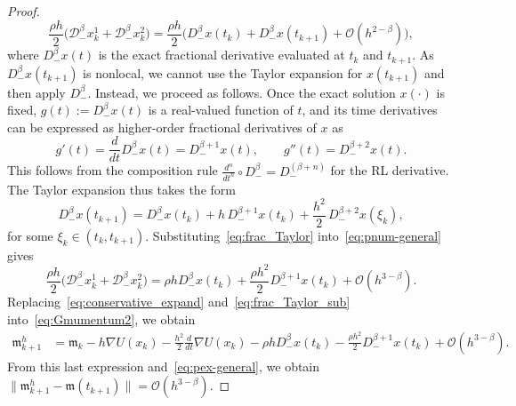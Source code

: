 \documentclass[a4paper,10pt,reqno]{amsart}
\theoremstyle{definition}
\newcommand{\m}{\mathfrak{m}}
\begin{document}
\begin{proof}
  \begin{equation}
\frac{\rho h}{2}\Big(\mathcal D_{-}^{\beta}  x_k^1 +\mathcal D_{-}^{\beta}x_k^2\Big)=\frac{\rho h}{2}\Big(D_{-}^{\beta}  x(t_k) + D_{-}^{\beta}x(t_{k+1})+\mathcal{O}\!\left(h^{2-\beta}\right)\Big),
\label{eq:pnum-general}
\end{equation}
where $D_{-}^{\beta} x(t)$ is the exact fractional derivative evaluated at $t_k$ and $t_{k+1}$. As $D_{-}^{\beta} x(t_{k+1})$ is nonlocal, we cannot use the Taylor expansion for $x(t_{k+1})$ and then  apply $D_{-}^{\beta}$. Instead, we proceed as follows. Once the exact solution $x(\cdot)$ is fixed, $g(t):=D_{-}^{\beta} x(t)$ is a real-valued function of $t$, and its time derivatives can be expressed as higher-order fractional derivatives of $x$ as
$$g'(t)=\frac{d}{dt}D_{-}^{\beta} x(t)=D_{-}^{\beta+1} x(t),\qquad g''(t)=D_{-}^{\beta+2} x(t).$$
This follows from the composition rule
$\frac{d^n}{dt^n}\circ D_{-}^{\beta} = D_{-}^{(\beta+n)}$ for the RL derivative. The Taylor expansion thus takes the form
\begin{equation}\label{eq:frac_Taylor}
D_-^{\beta}x(t_{k+1})
  = D_-^{\beta}x(t_k)
  + h\,D_-^{\beta+1}x(t_k)
  + \frac{h^2}{2}\,D_-^{\beta+2}x(\xi_k),
\end{equation}
for some $\xi_k \in (t_k, t_{k+1})$. Substituting~\eqref{eq:frac_Taylor}
 into~\eqref{eq:pnum-general} gives
  \begin{equation}\label{eq:frac_Taylor_sub}
\frac{\rho h}{2}\Big(\mathcal D_{-}^{\beta}  x_k^1 +\mathcal D_{-}^{\beta}x_k^2\Big)=\rho h D_{-}^{\beta}  x(t_k) + \frac{\rho h^2}{2} D_{-}^{\beta+1}x(t_{k})+\mathcal{O}\!\left(h^{3-\beta}\right).
\end{equation}
Replacing~\eqref{eq:conservative_expand} and~\eqref{eq:frac_Taylor_sub} into~\eqref{eq:Gmumentum2}, we obtain
  \begin{align}
 \m_{k+1}^h &= \m_k  -h\nabla U(x_k)- \frac{h^2}{2}\frac{d}{dt}\nabla U(x_{k})- \rho h D_{-}^{\beta}  x(t_k) - \frac{\rho h^2}{2} D_{-}^{\beta+1}x(t_{k})+\mathcal{O}\!\left(h^{3-\beta}\right).
\end{align}
From this last expression and~\eqref{eq:pex-general}, we obtain
$\|\m_{k+1}^h-\m(t_{k+1})\|=\mathcal{O}\!\left(h^{3-\beta}\right).$

\end{proof}
\end{document}

